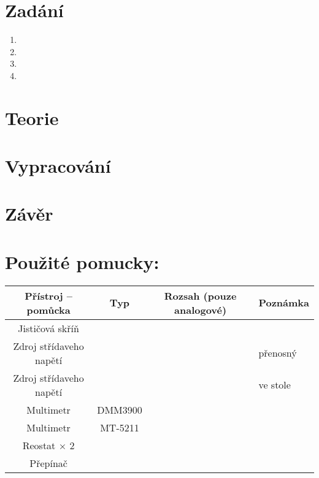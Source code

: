 \documentclass[a4paper]{article}
\begin{document}


\section*{Zad\'an\'i}
\begin{enumerate}
	\item 
	\item
	\item
	\item
\end{enumerate}

\section*{Teorie}

\section*{Vypracování}

\section*{Závěr}


\section*{Použité pomucky:}
\begin{tabularx}{\linewidth}{c|c|c|l}
	Přístroj – pomůcka&Typ&Rozsah (pouze analogové)
	& Poznámka \\
	\hline
	Jisti\v{c}ov\'{a} sk\v{r}\'{i}\v{n}&&&\\
	\hline
	Zdroj st\v{r}\'idaveho nap\v{e}t\'i&&&p\v{r}enosn\'y\\
	\hline
	Zdroj st\v{r}\'idaveho nap\v{e}t\'i&&&ve stole\\
	\hline
	Multimetr&DMM3900&&\\
	\hline
	Multimetr&MT-5211&&\\
	\hline
	Reostat $\times$ 2&&&\\
	\hline
	P\v{r}ep\'ina\v{c}&&&\\
	\hline
\end{tabularx}
\end{document}
